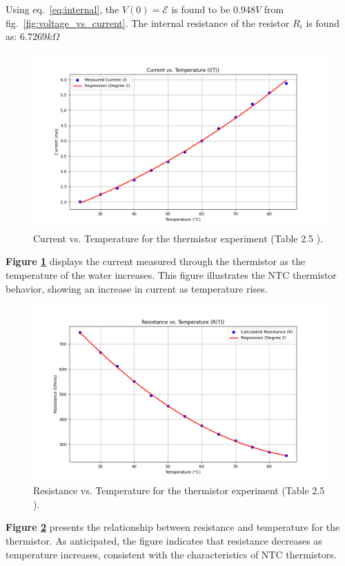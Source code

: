 \documentclass[journal]{IEEEtran}
\begin{document}
Using eq.~\ref{eq:internal}, the $V(0) = \mathcal{E}$ is found to be $0.948 V$ from fig.~\ref{fig:voltage_vs_current}. The internal resistance of the resistor $R_i$ is found as: $6.7269 k\Omega$ 


\begin{figure}[H]
    \centering
    \includegraphics[width=\linewidth]{output_plots/Current_vs_Temperature.png}
    \caption{Current vs. Temperature for the thermistor experiment (Table 2.5 \cite{lab_manual}).}
    \label{fig:current_vs_temperature}
\end{figure}
\textbf{Figure \ref{fig:current_vs_temperature}} displays the current measured through the thermistor as the temperature of the water increases. This figure illustrates the NTC thermistor behavior, showing an increase in current as temperature rises.

\begin{figure}[H]
    \centering
    \includegraphics[width=\linewidth]{output_plots/Resistance_vs_Temperature.png}
    \caption{Resistance vs. Temperature for the thermistor experiment (Table 2.5 ).}
    \label{fig:resistance_vs_temperature}
\end{figure}
\textbf{Figure \ref{fig:resistance_vs_temperature}} presents the relationship between resistance and temperature for the thermistor. As anticipated, the figure indicates that resistance decreases as temperature increases, consistent with the characteristics of NTC thermistors.
\end{document}
